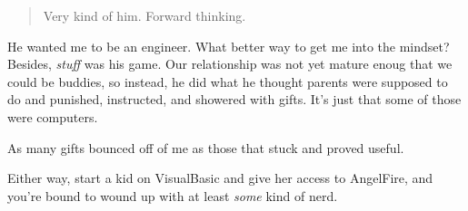 \begin{quote}
Very kind of him. Forward thinking.
\end{quote}

He wanted me to be an engineer. What better way to get me into the mindset? Besides, \emph{stuff} was his game. Our relationship was not yet mature enoug that we could be buddies, so instead, he did what he thought parents were supposed to do and punished, instructed, and showered with gifts. It's just that some of those were computers.

As many gifts bounced off of me as those that stuck and proved useful.

Either way, start a kid on VisualBasic and give her access to AngelFire, and you're bound to wound up with at least \emph{some} kind of nerd.
